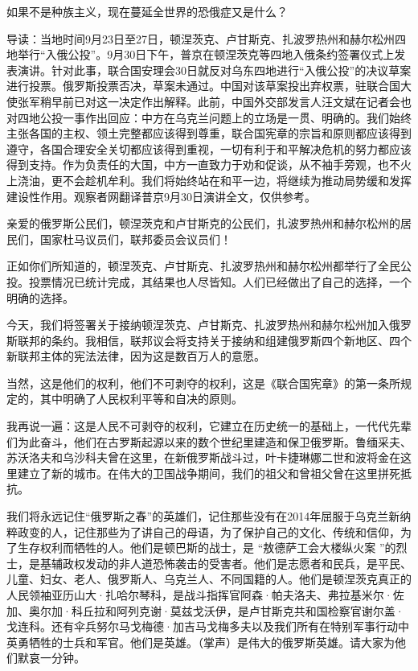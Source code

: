 \documentclass[UTF8, 11pt, oneside]{ctexart}
\begin{document}
\begin{center}
    \LARGE{如果不是种族主义，现在蔓延全世界的恐俄症又是什么？}
\end{center}


导读：当地时间9月23日至27日，顿涅茨克、卢甘斯克、扎波罗热州和赫尔松州四地举行“入俄公投”。9月30日下午，普京在顿涅茨克等四地入俄条约签署仪式上发表演讲。针对此事，联合国安理会30日就反对乌东四地进行“入俄公投”的决议草案进行投票。俄罗斯投票否决，草案未通过。中国对该草案投出弃权票，驻联合国大使张军稍早前已对这一决定作出解释。此前，中国外交部发言人汪文斌在记者会也对四地公投一事作出回应：中方在乌克兰问题上的立场是一贯、明确的。我们始终主张各国的主权、领土完整都应该得到尊重，联合国宪章的宗旨和原则都应该得到遵守，各国合理安全关切都应该得到重视，一切有利于和平解决危机的努力都应该得到支持。作为负责任的大国，中方一直致力于劝和促谈，从不袖手旁观，也不火上浇油，更不会趁机牟利。我们将始终站在和平一边，将继续为推动局势缓和发挥建设性作用。观察者网翻译普京9月30日演讲全文，仅供参考。



\newpage

亲爱的俄罗斯公民们，顿涅茨克和卢甘斯克的公民们，扎波罗热州和赫尔松州的居民们，国家杜马议员们，联邦委员会议员们！

正如你们所知道的，顿涅茨克、卢甘斯克、扎波罗热州和赫尔松州都举行了全民公投。投票情况已统计完成，其结果也人尽皆知。人们已经做出了自己的选择，一个明确的选择。

今天，我们将签署关于接纳顿涅茨克、卢甘斯克、扎波罗热州和赫尔松州加入俄罗斯联邦的条约。我相信，联邦议会将支持关于接纳和组建俄罗斯四个新地区、四个新联邦主体的宪法法律，因为这是数百万人的意愿。

当然，这是他们的权利，他们不可剥夺的权利，这是《联合国宪章》的第一条所规定的，其中明确了人民权利平等和自决的原则。

我再说一遍：这是人民不可剥夺的权利，它建立在历史统一的基础上，一代代先辈们为此奋斗，他们在古罗斯起源以来的数个世纪里建造和保卫俄罗斯。鲁缅采夫、苏沃洛夫和乌沙科夫曾在这里，在新俄罗斯战斗过，叶卡捷琳娜二世和波将金在这里建立了新的城市。在伟大的卫国战争期间，我们的祖父和曾祖父曾在这里拼死抵抗。

我们将永远记住“俄罗斯之春”的英雄们，记住那些没有在2014年屈服于乌克兰新纳粹政变的人，记住那些为了讲自己的母语，为了保护自己的文化、传统和信仰，为了生存权利而牺牲的人。他们是顿巴斯的战士，是 “敖德萨工会大楼纵火案 ”的烈士，是基辅政权发动的非人道恐怖袭击的受害者。他们是志愿者和民兵，是平民、儿童、妇女、老人、俄罗斯人、乌克兰人、不同国籍的人。他们是顿涅茨克真正的人民领袖亚历山大·扎哈尔琴科，是战斗指挥官阿森·帕夫洛夫、弗拉基米尔·佐加、奥尔加·科丘拉和阿列克谢·莫兹戈沃伊，是卢甘斯克共和国检察官谢尔盖·戈连科。还有伞兵努尔马戈梅德·加吉马戈梅多夫以及我们所有在特别军事行动中英勇牺牲的士兵和军官。他们是英雄。（掌声）是伟大的俄罗斯英雄。请大家为他们默哀一分钟。
\end{document}
